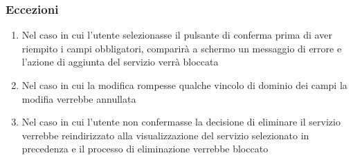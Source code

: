         \subsubsection{Eccezioni}
            \begin{enumerate}
                \item Nel caso in cui l'utente selezionasse il pulsante di conferma prima di aver riempito i campi obbligatori, comparirà a schermo un messaggio di errore e l'azione di aggiunta del servizio verrà bloccata
                \item Nel caso in cui la modifica rompesse qualche vincolo di dominio dei campi la modifia verrebbe annullata
                \item Nel caso in cui l'utente non confermasse la decisione di eliminare il servizio verrebbe reindirizzato alla visualizzazione del servizio selezionato in precedenza e il processo di eliminazione verrebbe bloccato
            \end{enumerate}
